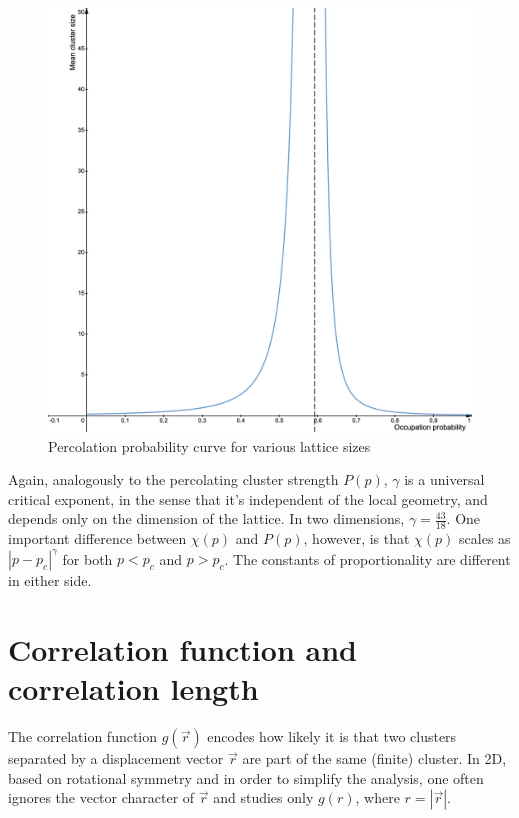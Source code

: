 \begin{figure}[H]
  \includegraphics[width=\linewidth]{Images/mean_cluster_size_1.png}
  \caption{Percolation probability curve for various lattice sizes}
  \label{fig:mean_cluster_size_1}
\end{figure}


Again, analogously to the percolating cluster strength $P(p)$, $\gamma$ is a universal critical exponent, in the sense that it's independent of the local geometry, and depends only on the dimension of the lattice. In two dimensions, $\gamma = \frac{43}{18}$. One important difference between $\chi(p)$ and $P(p)$, however, is that $\chi(p)$ scales as $|p - p_c|^\gamma$ for both $p < p_c$ and $p > p_c$. The constants of proportionality are different in either side.


\section{Correlation function and correlation length} 

The correlation function $g(\vec{r})$ encodes how likely it is that two clusters separated by a displacement vector $\vec{r}$ are part of the same (finite) cluster. In 2D,  based on rotational symmetry and in order to simplify the analysis, one often ignores the vector character of  $\vec{r}$ and studies only $g(r)$, where $r = |\vec{r}|$.


